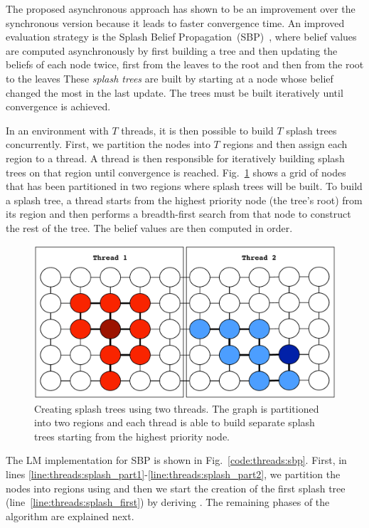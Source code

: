 

The proposed asynchronous approach has shown to be an improvement over the
synchronous version because it leads to faster convergence time. An improved
evaluation strategy is the Splash Belief
Propagation~(SBP)~\cite{Gonzalez+al:aistats09paraml}, where belief values are
computed asynchronously by first building a tree and then updating the beliefs
of each node twice, first from the leaves to the root and then from the root to
the leaves These \emph{splash trees} are built by starting at a node whose
belief changed the most in the last update. The trees must be built iteratively
until convergence is achieved.

In an environment with $T$ threads, it is then possible to build $T$ splash
trees concurrently. First, we partition the nodes into $T$ regions and then
assign each region to a thread. A thread is then responsible for iteratively
building splash trees on that region until convergence is reached.
Fig.~\ref{fig:threads:splash_bp} shows a grid of nodes that has been partitioned
in two regions where splash trees will be built. To build a splash tree, a
thread starts from the highest priority node (the tree's root) from its region
and then performs a breadth-first search from that node to construct the rest of
the tree. The belief values are then computed in order.

\begin{figure}[ht]
   \begin{center}
      \includegraphics[width=0.7\linewidth]{figures/threads/splash_bp}
   \end{center}
   \caption{Creating splash trees using two threads. The graph is
      partitioned into two regions and each thread is able to build separate
   splash trees starting from the highest priority node.}
   \label{fig:threads:splash_bp}
\end{figure}

The LM implementation for SBP is shown in Fig.~\ref{code:threads:sbp}. First,
in lines \ref{line:threads:splash_part1}-\ref{line:threads:splash_part2}, we
partition the nodes into regions using  and then we start the
creation of the first splash tree (line~\ref{line:threads:splash_first}) by
deriving .  The remaining phases of the algorithm are
explained next.

